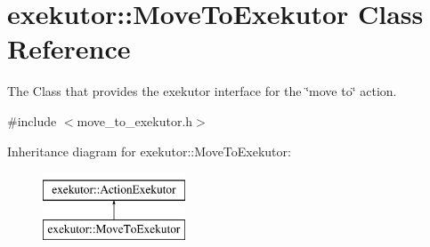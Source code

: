 \hypertarget{classexekutor_1_1MoveToExekutor}{\section{exekutor\-:\-:\-Move\-To\-Exekutor \-Class \-Reference}
\label{classexekutor_1_1MoveToExekutor}
}


\-The \-Class that provides the exekutor interface for the \char`\"{}move to\char`\"{} action.  




{\ttfamily \#include $<$move\-\_\-to\-\_\-exekutor.\-h$>$}

\-Inheritance diagram for exekutor\-:\-:\-Move\-To\-Exekutor\-:\begin{figure}[H]
\begin{center}
\leavevmode
\includegraphics[height=2.000000cm]{classexekutor_1_1MoveToExekutor}
\end{center}
\end{figure}
